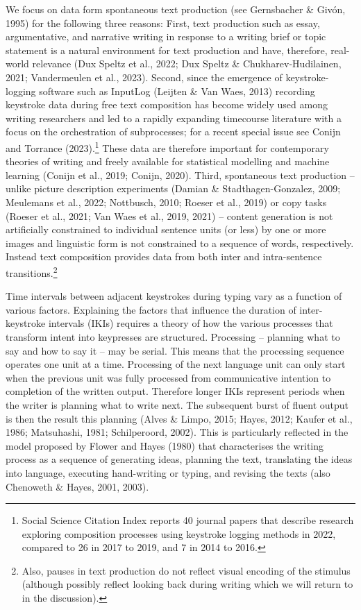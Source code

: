 \documentclass[
  man,floatsintext]{apa7}
\begin{document}
We focus on data form spontaneous text production (see Gernsbacher \& Givón, 1995) for the following three reasons: First, text production such as essay, argumentative, and narrative writing in response to a writing brief or topic statement is a natural environment for text production and have, therefore, real-world relevance (Dux Speltz et al., 2022; Dux Speltz \& Chukharev-Hudilainen, 2021; Vandermeulen et al., 2023). Second, since the emergence of keystroke-logging software such as InputLog (Leijten \& Van Waes, 2013) recording keystroke data during free text composition has become widely used among writing researchers and led to a rapidly expanding timecourse literature with a focus on the orchestration of subprocesses; for a recent special issue see Conijn and Torrance (2023).\footnote{Social Science Citation Index reports 40 journal papers that describe research exploring composition processes using keystroke logging methods in 2022, compared to 26 in 2017 to 2019, and 7 in 2014 to 2016.} These data are therefore important for contemporary theories of writing and freely available for statistical modelling and machine learning (Conijn et al., 2019; Conijn, 2020). Third, spontaneous text production -- unlike picture description experiments (Damian \& Stadthagen-Gonzalez, 2009; Meulemans et al., 2022; Nottbusch, 2010; Roeser et al., 2019) or copy tasks (Roeser et al., 2021; Van Waes et al., 2019, 2021) -- content generation is not artificially constrained to individual sentence units (or less) by one or more images and linguistic form is not constrained to a sequence of words, respectively. Instead text composition provides data from both inter and intra-sentence transitions.\footnote{Also, pauses in text production do not reflect visual encoding of the stimulus (although possibly reflect looking back during writing which we will return to in the discussion).}

Time intervals between adjacent keystrokes during typing vary as a function of various factors. Explaining the factors that influence the duration of inter-keystroke intervals (IKIs) requires a theory of how the various processes that transform intent into keypresses are structured. Processing -- planning what to say and how to say it -- may be serial. This means that the processing sequence operates one unit at a time. Processing of the next language unit can only start when the previous unit was fully processed from communicative intention to completion of the written output. Therefore longer IKIs represent periods when the writer is planning what to write next. The subsequent burst of fluent output is then the result this planning (Alves \& Limpo, 2015; Hayes, 2012; Kaufer et al., 1986; Matsuhashi, 1981; Schilperoord, 2002). This is particularly reflected in the model proposed by Flower and Hayes (1980) that characterises the writing process as a sequence of generating ideas, planning the text, translating the ideas into language, executing hand-writing or typing, and revising the texts (also Chenoweth \& Hayes, 2001, 2003).
\end{document}
